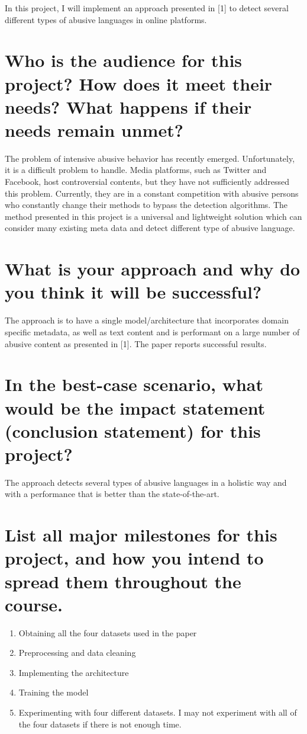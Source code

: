 \documentclass[11pt, twocolumn]{article}
\begin{document}
In this project, I will implement an approach presented in [1] to detect several different types of abusive languages in online platforms.

\section{Who is the audience for this project? How does it meet their needs? What happens if their needs remain unmet?}

The problem of intensive abusive behavior has recently emerged. Unfortunately, it is a difficult problem to handle. Media platforms, such as Twitter and Facebook, host controversial contents, but they have not sufficiently addressed this problem. Currently, they are in a constant competition with abusive persons who constantly change their methods to bypass the detection algorithms. The method presented in this project is a universal and lightweight solution which can consider many existing meta data and detect different type of abusive language. 

\section{What is your approach and why do you think it will be successful?}

The approach is to have a single model/architecture that incorporates domain specific metadata, as well as text content and is performant on a large number of abusive content as presented in [1]. The paper reports successful results.

\section{In the best-case scenario, what would be the impact statement (conclusion statement) for this project?  } 

The approach detects several types of abusive languages in a holistic way and with a performance that is better than the state-of-the-art.


\section{List all major milestones for this project, and how you intend to spread them throughout the course.}

\begin{enumerate}
  \item Obtaining all the four datasets used in the paper
  \item Preprocessing and data cleaning
  \item Implementing the architecture
  \item Training the model
  \item Experimenting with four different datasets. I may not experiment with all of the four datasets if there is not enough time.
\end{enumerate}
\end{document}
